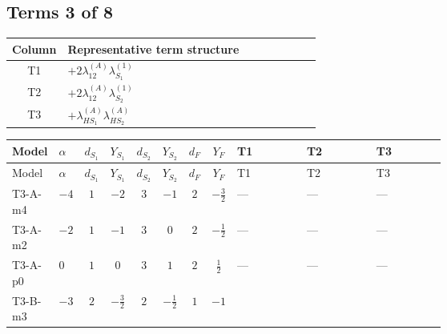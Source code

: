 \documentclass[8pt]{article}
\begin{document}
\begin{landscape}
\subsection*{Terms 3 of 8}
\begin{center}
\begin{tabular}{@{}c >{\raggedright\arraybackslash}p{0.82\linewidth}@{}}
\toprule
Column & Representative term structure \\
\midrule
T1 & \(\displaystyle +2 {\lambda_{12}^{(A)}} {\lambda_{S_1}^{(1)}}\) \\
\midrule
T2 & \(\displaystyle +2 {\lambda_{12}^{(A)}} {\lambda_{S_2}^{(1)}}\) \\
\midrule
T3 & \(\displaystyle +{\lambda_{HS_1}^{(A)}} {\lambda_{HS_2}^{(A)}}\) \\
\midrule
\bottomrule
\end{tabular}
\end{center}
\smallskip
\tiny
\begin{longtable}{@{}llcccccc >{\raggedright\arraybackslash}p{0.21\linewidth} >{\raggedright\arraybackslash}p{0.21\linewidth} >{\raggedright\arraybackslash}p{0.21\linewidth}@{}}
\toprule
Model & $\alpha$ & $d_{S_1}$ & $Y_{S_1}$ & $d_{S_2}$ & $Y_{S_2}$ & $d_F$ & $Y_F$ & T1 & T2 & T3 \\
\midrule
\endfirsthead
\toprule
Model & $\alpha$ & $d_{S_1}$ & $Y_{S_1}$ & $d_{S_2}$ & $Y_{S_2}$ & $d_F$ & $Y_F$ & T1 & T2 & T3 \\
\midrule
\endhead
T3-A-m4 & $-4$ & $1$ & $-2$ & $3$ & $-1$ & $2$ & $-\frac{3}{2}$ & --- & --- & --- \\
\midrule
T3-A-m2 & $-2$ & $1$ & $-1$ & $3$ & $0$ & $2$ & $-\frac{1}{2}$ & --- & --- & --- \\
\midrule
T3-A-p0 & $0$ & $1$ & $0$ & $3$ & $1$ & $2$ & $\frac{1}{2}$ & --- & --- & --- \\
\midrule
T3-B-m3 & $-3$ & $2$ & $-\frac{3}{2}$ & $2$ & $-\frac{1}{2}$ & $1$ & $-1$ & \scriptsize\adjustbox{max width=\linewidth}{$\begin{gathered} +2 {\lambda_{12}^{(A)}} {\lambda_{S_1}^{(1)}}\end{gathered}$} & \scriptsize\adjustbox{max width=\linewidth}{$\begin{gathered} +2 {\lambda_{12}^{(A)}} {\lambda_{S_2}^{(1)}}\end{gathered}$} & \scriptsize\adjustbox{max width=\linewidth}{$\begin{gathered} +{\lambda_{HS_1}^{(A)}} {\lambda_{HS_2}^{(A)}}\end{gathered}$} \\

\end{longtable}
\end{landscape}
\end{document}
